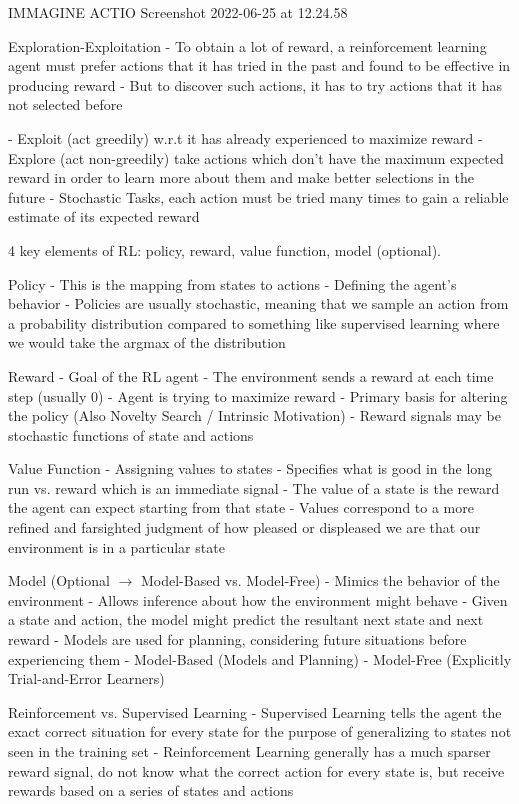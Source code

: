 IMMAGINE ACTIO
Screenshot 2022-06-25 at 12.24.58

Exploration-Exploitation
- To obtain a lot of reward, a reinforcement learning agent must prefer actions that it has tried in the past and found to be effective in producing reward
- But to discover such actions, it has to try actions that it has not selected before

- Exploit (act greedily) w.r.t it has already experienced to maximize reward
- Explore (act non-greedily) take actions which don't have the maximum expected reward in order to learn more about them and make better selections in the future
- Stochastic Tasks, each action must be tried many times to gain a reliable estimate of its expected reward


4 key elements of RL: policy, reward, value function, model (optional).

Policy
- This is the mapping from states to actions
- Defining the agent's behavior
- Policies are usually stochastic, meaning that we sample an action from a probability distribution compared to something like supervised learning where we would take the argmax of the distribution


Reward
- Goal of the RL agent
- The environment sends a reward at each time step (usually 0)
- Agent is trying to maximize reward
- Primary basis for altering the policy (Also Novelty Search / Intrinsic Motivation)
- Reward signals may be stochastic functions of state and actions



Value Function
- Assigning values to states
- Specifies what is good in the long run vs. reward which is an immediate signal
- The value of a state is the reward the agent can expect starting from that state
- Values correspond to a more refined and farsighted judgment of how pleased or displeased we are that our environment is in a particular state


Model (Optional $\rightarrow$ Model-Based vs. Model-Free)
- Mimics the behavior of the environment
- Allows inference about how the environment might behave
- Given a state and action, the model might predict the resultant next state and next reward
- Models are used for planning, considering future situations before experiencing them
- Model-Based (Models and Planning)
- Model-Free (Explicitly Trial-and-Error Learners)


Reinforcement vs. Supervised Learning
- Supervised Learning tells the agent the exact correct situation for every state for the purpose of generalizing to states not seen in the training set
- Reinforcement Learning generally has a much sparser reward signal, do not know what the correct action for every state is, but receive rewards based on a series of states and actions

